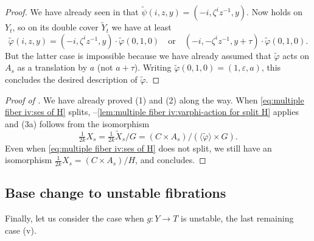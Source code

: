 \documentclass[reqno, letterpaper]{amsart}
\numberwithin{equation}{subsection}
\let\to\longrightarrow
\begin{document}
\begin{proof}
				We have already seen in  that $\tilde \psi (i,z,y) = (-i, \zeta^i z^{-1}, y)$. Now  holds on $Y_t$, so on its double cover $\tilde Y_t$ we have at least
				\[ \tilde \varphi (i,z,y) = (-i, \zeta^iz^{-1}, y) \cdot \tilde \varphi(0,1,0) \quad\mbox{or}\quad (-i, -\zeta^iz^{-1}, y + \tau) \cdot \tilde \varphi(0,1,0) .\]
				But the latter case is impossible because we have already assumed that $\tilde \varphi$ acts on $A_s$ as a translation by $a$ (not $a + \tau$). Writing $\tilde \varphi(0,1,0) = (1,\varepsilon,a)$, this concludes the desired description of $\tilde \varphi$.
			\end{proof}
			
			\begin{proof} [Proof of ]
				We have already proved (1) and (2) along the way. When \eqref{eq:multiple fiber iv:ses of H} splits, --\ref{lem:multiple fiber iv:varphi-action for split H} applies and (3a) follows from the isomorphism
				\[ \tfrac{1}{2k} X_s = \tfrac{1}{2k} \tilde X_s / G = (C \times A_s) / (\langle \tilde \varphi \rangle \times G) .\]
				Even when \eqref{eq:multiple fiber iv:ses of H} does not split, we still have an isomorphism $\tfrac{1}{2k} X_s = (C \times A_s) / H$, and  concludes.
			\end{proof}
			
			
			
	\subsection{Base change to unstable fibrations}
		Finally, let us consider the case when $g : Y \to T$ is unstable, the last remaining case (v).
		
\end{document}
